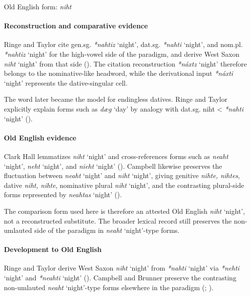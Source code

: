 \documentclass[
  british,
  a4paper,
]{article}
\providecommand{\Recon}[1]{\emph{*#1}}
\begin{document}
Old English form: \emph{niht}

\paragraph{Reconstruction and comparative
evidence}\label{reconstruction-and-comparative-evidence-140}

Ringe and Taylor cite gen.sg. \Recon{nahtiz} `night', dat.sg.
\Recon{nahti} `night', and nom.pl. \Recon{nahtiz} `night' for the
high-vowel side of the paradigm, and derive West Saxon {\emph{niht}}
`night' from that side (). The citation reconstruction \Recon{náxtz} `night' therefore
belongs to the nominative-like headword, while the derivational input
\Recon{náxti} `night' represents the dative-singular cell.

The word later became the model for endingless datives. Ringe and Taylor
explicitly explain forms such as {\emph{dæg}} `day' by analogy with
dat.sg. niht \textless{} \Recon{nahti} `night'
().

\paragraph{Old English evidence}\label{old-english-evidence-142}

Clark Hall lemmatizes {\emph{niht}} `night' and cross-references forms
such as {\emph{neaht}} `night', {\emph{neht}} `night', and
{\emph{nieht}} `night' (). Campbell likewise preserves the fluctuation between
{\emph{neaht}} `night' and {\emph{niht}} `night', giving genitive
\emph{nihte, nihtes}, dative \emph{niht, nihte}, nominative plural
\emph{niht} `night', and the contrasting plural-side forms represented
by {\emph{neahtas}} `night' ().

The comparison form used here is therefore an attested Old English
\emph{niht} `night', not a reconstructed substitute. The broader lexical
record still preserves the non-umlauted side of the paradigm in
{\emph{neaht}} `night'-type forms.

\paragraph{Development to Old
English}\label{development-to-old-english-140}

Ringe and Taylor derive West Saxon \emph{niht} `night' from
\Recon{nahti} `night' via \Recon{nehti} `night' and \Recon{neahti}
`night' ().
Campbell and Brunner preserve the contrasting non-umlauted
{\emph{neaht}} `night'-type forms elsewhere in the paradigm
(;
).
\end{document}
